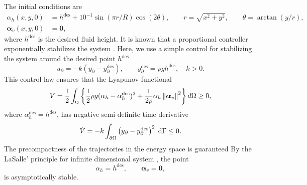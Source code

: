  The initial conditions are
\begin{equation}
\begin{aligned}
\alpha_h(x, y, 0) &= h^{\text{des}} + 10^{-1} \sin(\pi r/R) \cos(2 \theta), \qquad r = \sqrt{x^2 + y^2}, \qquad \theta = \arctan(y/r), \\
\bm\alpha_v(x, y, 0) &= \bm{0},
\end{aligned}
\end{equation}
where $ h^{\text{des}}$ is the desired fluid height. It is known that a proportional controller exponentially stabilizes the system \cite{dos2008boundary}. Here, we use a simple control for stabilizing the system around the desired point $h^{\text{des}}$
\begin{equation}\label{eq:ctrllaw_SWE}
u_\partial = -k (y_\partial - y_\partial^{\text{des}}), \qquad y_\partial^{\text{des}}= \rho g h^{\text{des}}, \quad k>0.
\end{equation}
This control law ensures that the Lyapunov functional
\begin{equation}
	V = \frac{1}{2} \int_{\Omega}\left\{\frac{1}{2} \rho g (\alpha_h - \alpha_h^{\text{des}})^2 + \frac{1}{2\rho} \alpha_h \left\|\bm{\alpha}_v\right\|^2 \right\} d\Omega \ge 0,
\end{equation}
where $\alpha_h^{\text{des}}=h^{\text{des}}$, has negative semi definite time derivative
\begin{equation}
	\dot{V} = -k \int_{\partial \Omega}\left({y}_\partial - {y}_\partial^{\text{des}} \right)^2 \d{\Gamma} \le 0.
\end{equation}
The precompactness of the trajectories in the energy space is guaranteed
By the LaSalle' principle for infinite dimensional system \cite{henry2006geometric}, the point 
\begin{equation}
	\alpha_h = h^{\text{des}}, \qquad \bm{\alpha}_v = \bm{0},
\end{equation}
is asymptotically stable. \\

